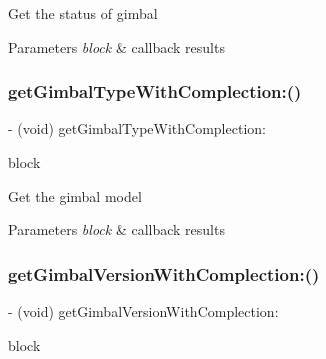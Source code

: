 Get the status of gimbal


\begin{DoxyParams}{Parameters}
{\em block} & callback results \\
\hline
\end{DoxyParams}
\mbox{\label{interface_p_v_gimabal_a8937f926f4f8b06a20937ae541b55e27}} 
\subsubsection{\texorpdfstring{get\+Gimbal\+Type\+With\+Complection\+:()}{getGimbalTypeWithComplection:()}}
{\footnotesize\ttfamily -\/ (void) get\+Gimbal\+Type\+With\+Complection\+: \begin{DoxyParamCaption}\item[{(void($^\wedge$)(P\+V\+Gimbal\+Type gimbal\+Type, N\+S\+Error $\ast$\+\_\+\+Nullable error))}]{block }\end{DoxyParamCaption}}

Get the gimbal model


\begin{DoxyParams}{Parameters}
{\em block} & callback results \\
\hline
\end{DoxyParams}
\mbox{\label{interface_p_v_gimabal_ab7f782bde28693b3647bd48694f3d3f1}} 
\subsubsection{\texorpdfstring{get\+Gimbal\+Version\+With\+Complection\+:()}{getGimbalVersionWithComplection:()}}
{\footnotesize\ttfamily -\/ (void) get\+Gimbal\+Version\+With\+Complection\+: \begin{DoxyParamCaption}\item[{(void($^\wedge$)(int version, N\+S\+Error $\ast$\+\_\+\+Nullable error))}]{block }\end{DoxyParamCaption}}

